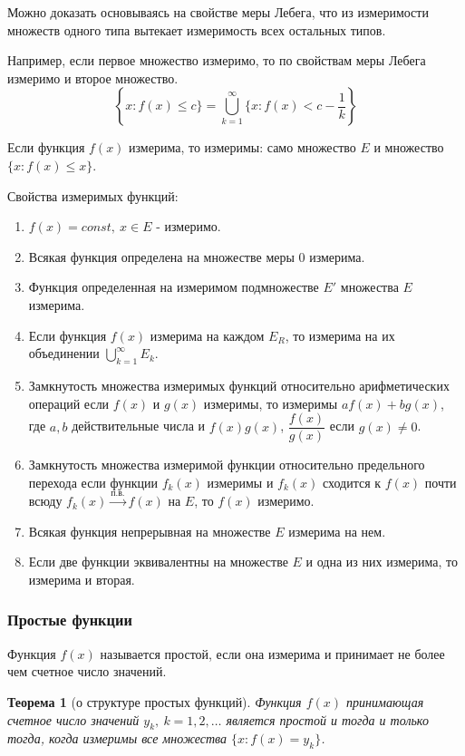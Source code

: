\documentclass[14pt,a4paper]{extarticle}
\newtheorem{theorem}{Теорема}[section]
\theoremstyle{definition}
\theoremstyle{remark}
\renewcommand{\[}{\begin{dmath*}[compact]}
\renewcommand{\]}{\end{dmath*}}
\newcommand{\be}{\begin{enumerate}}
\newcommand{\ee}{\end{enumerate}}
\newcommand{\sep}{ , \ \allowbreak }
\newcommand\f[2]{\dfrac{#1}{#2}}
\begin{document}
Можно доказать основываясь на свойстве меры Лебега,
что из измеримости множеств одного типа вытекает
измеримость всех остальных типов.

Например, если первое множество измеримо,
то по свойствам меры Лебега измеримо и второе множество.
\[\left\{x: f(x) \leq c\}= \bigcup_{k=1}^\infty\{x:f(x) < c - \f{1}{k}\right\}\]

Если функция $f(x)$ измерима, то измеримы: само множество $E$ и множество
$\{x:f(x)\leq x\}$.

Свойства измеримых функций:

\be
  \item $f(x)=const \sep x \in E$ - измеримо.

  \item Всякая функция определена на множестве меры 0 измерима.

  \item Функция определенная на измеримом подмножестве $E'$ множества
  $E$ измерима.

  \item Если функция $f(x)$ измерима на каждом $E_R$, то измерима на их
  объединении $\bigcup _ {k=1}^\infty E_k$.

  \item Замкнутость множества измеримых функций относительно арифметических
  операций если $f(x)$ и $g(x)$ измеримы, то измеримы $af(x)+ bg(x)$, где $a,b$
  действительные числа и $f(x)g(x)$, $\f{f(x)}{g(x)}$ если $g(x) \neq 0$.

  \item Замкнутость множества измеримой функции относительно предельного
  перехода если функции $f_k(x)$ измеримы и $f_k(x)$ сходится к $f(x)$
  почти всюду $f_k(x) \xrightarrow{п.в.} f(x)$ на $E$, то $f(x)$ измеримо.

  \item Всякая функция непрерывная на множестве $E$ измерима на нем.

  \item Если две функции эквивалентны на множестве $E$ и одна из них измерима,
  то измерима и вторая.
\ee

\subsubsection{Простые функции}

Функция $f(x)$ называется простой, если она измерима и принимает
не более чем счетное число значений.

\begin{theorem}[о структуре простых функций]
  Функция $f(x)$ принимающая счетное число значений $y_k\sep k=1,2,\dots$
  является простой и тогда и только тогда,
  когда измеримы все множества $\{x: f(x) = y_k \}$.
\end{theorem}
\end{document}
